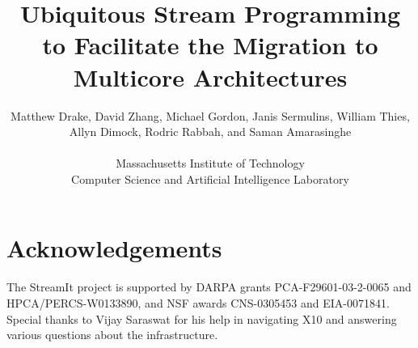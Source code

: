 \documentclass[times,11pt,twocolumn]{article}
\title{Ubiquitous Stream Programming to Facilitate the Migration to\\ Multicore Architectures}
\author{
  Matthew Drake, David Zhang, Michael Gordon, Janis Sermulins, William Thies,\\
  Allyn Dimock, Rodric Rabbah, and Saman Amarasinghe\\
  \begin{twoaffiliations}
    Massachusetts Institute of Technology\\
    Computer Science and Artificial Intelligence Laboratory
  \end{twoaffiliations}
}
\begin{document}
  
  \maketitle
  \thispagestyle{empty}
  
  \begin{abstract}
    \vspace{-5.5pt}
    
  \end{abstract}
  
  
  
  
  
  
  \vspace{-2pt}
  \section*{Acknowledgements}
  \vspace{-7pt}
  The StreamIt
  project is supported by DARPA grants PCA-F29601-03-2-0065 and
  HPCA/PERCS-W0133890, and NSF awards CNS-0305453 and EIA-0071841.
  Special thanks to Vijay Saraswat for his help in navigating X10 and
  answering various questions about the infrastructure.


\end{document}

